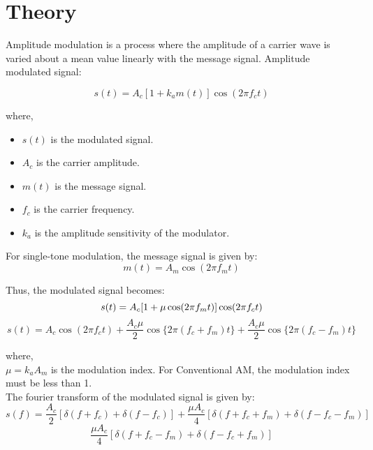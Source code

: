 \section*{Theory}

Amplitude modulation is a process where the amplitude of a carrier
wave is varied about a mean value linearly with the message signal. Amplitude modulated signal:

\begin{equation}
    s(t) = A_c[1 + k_a m(t)]\cos(2\pi f_c t)
\end{equation}

where,\\
\begin{itemize}
    \item $s(t)$ is the modulated signal.
    \item $A_c$ is the carrier amplitude.
    \item $m(t)$ is the message signal.
    \item $f_c$ is the carrier frequency.
    \item $k_a$ is the amplitude sensitivity of the modulator.
\end{itemize}

For single-tone modulation, the message signal is given by:
\begin{equation}
    m(t) = A_m \cos(2\pi f_m t)
\end{equation}

Thus, the modulated signal becomes:
\begin{equation}
    s(t) = A_c[1 + \mu \cos(2\pi f_m t)]\cos(2\pi f_c t) \\
\end{equation}
\begin{equation}
    s(t) = A_c\cos(2\pi f_c t) + \frac{A_c\mu}{2}\cos\{2\pi (f_c + f_m) t\} + \frac{A_c\mu}{2}\cos\{2\pi (f_c - f_m) t\}
    \label{eq:single_am}
\end{equation}

where,\\
$\mu = k_a A_m$ is the modulation index.
For Conventional AM, the modulation index must be less than 1.\\

The fourier transform of the modulated signal is given by:
\[
    s(f)=\frac{A_c}{2}[\delta(f+f_c) + \delta(f-f_c)] + \frac{\mu A_c}{4}[\delta(f+f_c+f_m) + \delta(f-f_c-f_m)] 
\]
\begin{equation}
    \frac{\mu A_c}{4}[\delta(f+f_c-f_m) + \delta(f-f_c+f_m)]
    \label{eq:single_am_fft}
\end{equation}

